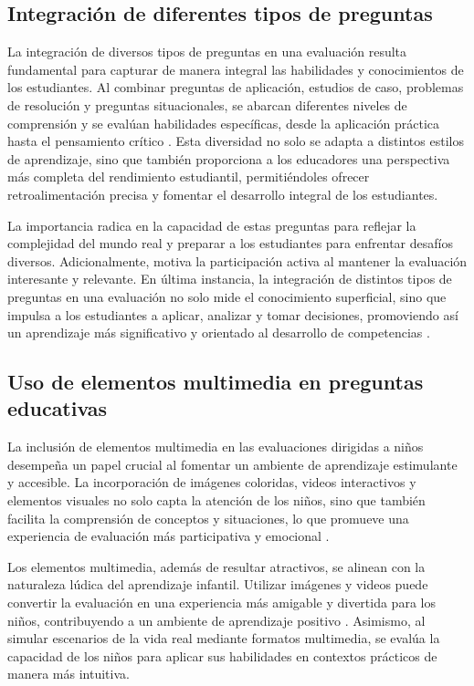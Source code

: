 \subsection{Integración de diferentes tipos de preguntas}

La integración de diversos tipos de preguntas en una evaluación resulta fundamental para capturar de manera integral las habilidades y conocimientos de los estudiantes. Al combinar preguntas de aplicación, estudios de caso, problemas de resolución y preguntas situacionales, se abarcan diferentes niveles de comprensión y se evalúan habilidades específicas, desde la aplicación práctica hasta el pensamiento crítico \cite{ref38_wiggins}. Esta diversidad no solo se adapta a distintos estilos de aprendizaje, sino que también proporciona a los educadores una perspectiva más completa del rendimiento estudiantil, permitiéndoles ofrecer retroalimentación precisa y fomentar el desarrollo integral de los estudiantes.

La importancia radica en la capacidad de estas preguntas para reflejar la complejidad del mundo real y preparar a los estudiantes para enfrentar desafíos diversos. Adicionalmente, motiva la participación activa al mantener la evaluación interesante y relevante. En última instancia, la integración de distintos tipos de preguntas en una evaluación no solo mide el conocimiento superficial, sino que impulsa a los estudiantes a aplicar, analizar y tomar decisiones, promoviendo así un aprendizaje más significativo y orientado al desarrollo de competencias \cite{ref39_haladyna}.

\subsection{Uso de elementos multimedia en preguntas educativas}

La inclusión de elementos multimedia en las evaluaciones dirigidas a niños desempeña un papel crucial al fomentar un ambiente de aprendizaje estimulante y accesible. La incorporación de imágenes coloridas, videos interactivos y elementos visuales no solo capta la atención de los niños, sino que también facilita la comprensión de conceptos y situaciones, lo que promueve una experiencia de evaluación más participativa y emocional \cite{ref40_mayer,ref41_clark}.

Los elementos multimedia, además de resultar atractivos, se alinean con la naturaleza lúdica del aprendizaje infantil. Utilizar imágenes y videos puede convertir la evaluación en una experiencia más amigable y divertida para los niños, contribuyendo a un ambiente de aprendizaje positivo \cite{ref42_cabero}. Asimismo, al simular escenarios de la vida real mediante formatos multimedia, se evalúa la capacidad de los niños para aplicar sus habilidades en contextos prácticos de manera más intuitiva.

